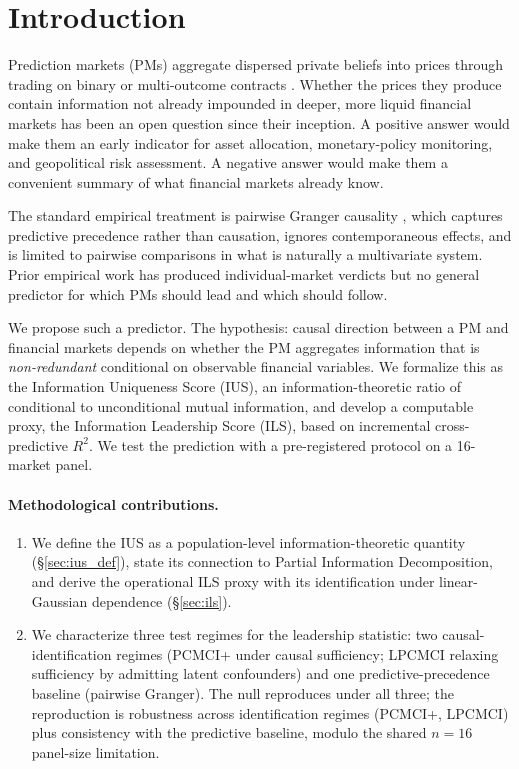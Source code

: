 \documentclass{article}
\begin{document}
\section{Introduction}
\label{sec:intro}

Prediction markets (PMs) aggregate dispersed private beliefs into prices through trading on binary or multi-outcome contracts \citep{arrow2008promise, wolfers2004prediction, manski2006interpreting}. Whether the prices they produce contain information not already impounded in deeper, more liquid financial markets has been an open question since their inception. A positive answer would make them an early indicator for asset allocation, monetary-policy monitoring, and geopolitical risk assessment. A negative answer would make them a convenient summary of what financial markets already know.

The standard empirical treatment is pairwise Granger causality \citep{granger1969investigating, tzeng2021predicting, abolghasemi2021determining}, which captures predictive precedence rather than causation, ignores contemporaneous effects, and is limited to pairwise comparisons in what is naturally a multivariate system. Prior empirical work has produced individual-market verdicts but no general predictor for which PMs should lead and which should follow.

We propose such a predictor. The hypothesis: causal direction between a PM and financial markets depends on whether the PM aggregates information that is \emph{non-redundant} conditional on observable financial variables. We formalize this as the Information Uniqueness Score (IUS), an information-theoretic ratio of conditional to unconditional mutual information, and develop a computable proxy, the Information Leadership Score (ILS), based on incremental cross-predictive $R^2$. We test the prediction with a pre-registered protocol on a 16-market panel.

\paragraph{Methodological contributions.}
\begin{enumerate}
\item We define the IUS as a population-level information-theoretic quantity (\S\ref{sec:ius_def}), state its connection to Partial Information Decomposition, and derive the operational ILS proxy with its identification under linear-Gaussian dependence (\S\ref{sec:ils}).
\item We characterize three test regimes for the leadership statistic: two causal-identification regimes (PCMCI+ under causal sufficiency; LPCMCI relaxing sufficiency by admitting latent confounders) and one predictive-precedence baseline (pairwise Granger). The null reproduces under all three; the reproduction is robustness across identification regimes (PCMCI+, LPCMCI) plus consistency with the predictive baseline, modulo the shared $n = 16$ panel-size limitation.
\end{enumerate}
\end{document}
